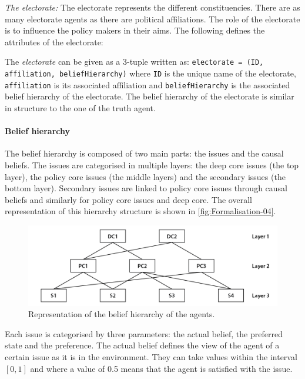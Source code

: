 \documentclass[11pt]{article}
\begin{document}
\emph{The electorate: } The electorate represents the different constituencies. There are as many electorate agents as there are political affiliations. The role of the electorate is to influence the policy makers in their aims. The following defines the attributes of the electorate:

The \emph{electorate} can be given as a 3-tuple written as: \texttt{electorate = (ID, affiliation, beliefHierarchy)} where \texttt{ID} is the unique name of the electorate, \texttt{affiliation} is its associated affiliation and \texttt{beliefHierarchy} is the associated belief hierarchy of the electorate.  The belief hierarchy of the electorate is similar in structure to the one of the truth agent.


\paragraph{Belief hierarchy}

The belief hierarchy is composed of two main parts: the issues and the causal beliefs. The issues are categorised in multiple layers: the deep core issues (the top layer), the policy core issues (the middle layers) and the secondary issues (the bottom layer). Secondary issues are linked to policy core issues through causal beliefs and similarly for policy core issues and deep core. The overall representation of this hierarchy structure is shown in \autoref{fig:Formalisation-04}.

\begin{figure}
\centering
\includegraphics[width = 0.95\linewidth, angle = 0]{figures/Formalisation-04}
\caption{Representation of the belief hierarchy of the agents.}
\label{fig:Formalisation-04}
\end{figure}

Each issue is categorised by three parameters: the actual belief, the preferred state and the preference. The actual belief defines the view of the agent of a certain issue as it is in the environment. They can take values within the interval $[0, 1]$ and where a value of 0.5 means that the agent is satisfied with the issue.
\end{document}
